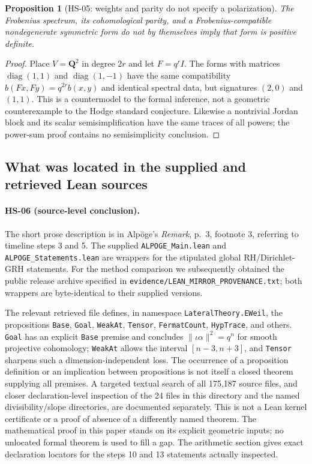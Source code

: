\documentclass[11pt,a4paper]{article}
\newtheorem{proposition}[theorem]{Proposition}
\theoremstyle{remark}
\begin{document}
\begin{proposition}[HS-05: weights and parity do not specify a polarization]
The Frobenius spectrum, its cohomological parity, and a Frobenius-compatible
nondegenerate symmetric form do not by themselves imply that form is
positive definite.
\end{proposition}
\begin{proof}
Place $V=\mathbf Q^2$ in degree $2r$ and let $F=q^r I$.
The forms with matrices $\operatorname{diag}(1,1)$ and
$\operatorname{diag}(1,-1)$ have the same compatibility
$b(Fx,Fy)=q^{2r}b(x,y)$ and identical spectral data, but signatures
$(2,0)$ and $(1,1)$.  This is a countermodel to the formal inference,
not a geometric counterexample to the Hodge standard conjecture.
Likewise a nontrivial Jordan block and its scalar semisimplification
have the same traces of all powers; the power-sum proof contains no
semisimplicity conclusion.
\end{proof}

\subsection{What was located in the supplied and retrieved Lean sources}
\label{sec:lean}
\paragraph{HS-06 (source-level conclusion).}
The short prose description is in Alp\"oge's \emph{Remark}, p.~3,
footnote 3, referring to timeline steps 3 and 5.  The supplied
\texttt{ALPOGE\_Main.lean} and \texttt{ALPOGE\_Statements.lean} are
wrappers for the stipulated global RH/Dirichlet-GRH statements.
For the method comparison we subsequently obtained the public release
archive specified in \texttt{evidence/LEAN\_MIRROR\_PROVENANCE.txt}; both
wrappers are byte-identical to their supplied versions.

The relevant retrieved file
defines, in namespace \texttt{LateralTheory.EWeil}, the propositions
\texttt{Base}, \texttt{Goal}, \texttt{WeakAt}, \texttt{Tensor},
\texttt{FermatCount}, \texttt{HypTrace}, and others.
\texttt{Goal} has an explicit \texttt{Base} premise and concludes
$\|\iota\alpha\|^2=q^n$ for smooth projective cohomology;
\texttt{WeakAt} allows the interval $[n-3,n+3]$, and
\texttt{Tensor} sharpens such a dimension-independent loss.
The occurrence of a proposition definition or an implication between
propositions is not itself a closed theorem supplying all premises.
A targeted textual search of all 175,187 source files, and closer
declaration-level inspection of the 24 files in this directory and
the named divisibility/slope directories, are documented separately.
This is not a Lean kernel certificate or a proof of absence of a differently
named theorem.  The mathematical proof in this paper stands on its
explicit geometric inputs; no unlocated formal theorem is used to fill
a gap.  The arithmetic section gives exact declaration locators for the
steps 10 and 13 statements actually inspected.
\end{document}
